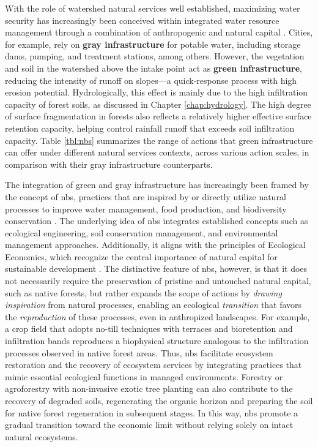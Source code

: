 \documentclass[./main_en.tex]{subfiles}
\begin{document}
\par With the role of watershed natural services well established, maximizing water security has increasingly been conceived within integrated water resource management through a combination of anthropogenic and natural capital \cite{un2018}. Cities, for example, rely on \textbf{gray infrastructure} for potable water, including storage dams, pumping, and treatment stations, among others. However, the vegetation and soil in the watershed above the intake point act as \textbf{green infrastructure}, reducing the intensity of runoff on slopes—a quick-response process with high erosion potential. Hydrologically, this effect is mainly due to the high infiltration capacity of forest soils, as discussed in Chapter \ref{chap:hydrology}. The high degree of surface fragmentation in forests also reflects a relatively higher effective surface retention capacity, helping control rainfall runoff that exceeds soil infiltration capacity. Table \ref{tbl:nbs} summarizes the range of actions that green infrastructure can offer under different natural services contexts, across various action scales, in comparison with their gray infrastructure counterparts.

\par The integration of green and gray infrastructure has increasingly been framed by the concept of \acrfull{nbs}, practices that are inspired by or directly utilize natural processes to improve water management, food production, and biodiversity conservation \cite{un2018, fao2019}. The underlying idea of \acrshort{nbs} integrates established concepts such as ecological engineering, soil conservation management, and environmental management approaches. Additionally, it aligns with the principles of Ecological Economics, which recognize the central importance of natural capital for sustainable development \cite{nesshover2017}. The distinctive feature of \acrshort{nbs}, however, is that it does not necessarily require the preservation of pristine and untouched natural capital, such as native forests, but rather expands the scope of actions by \textit{drawing inspiration} from natural processes, enabling an ecological \textit{transition} that favors the \textit{reproduction} of these processes, even in anthropized landscapes. For example, a crop field that adopts no-till techniques with terraces and bioretention and infiltration bands reproduces a biophysical structure analogous to the infiltration processes observed in native forest areas. Thus, \acrshort{nbs} facilitate ecosystem restoration and the recovery of ecosystem services by integrating practices that mimic essential ecological functions in managed environments. Forestry or agroforestry with non-invasive exotic tree planting can also contribute to the recovery of degraded soils, regenerating the organic horizon and preparing the soil for native forest regeneration in subsequent stages. In this way, \acrshort{nbs} promote a gradual transition toward the economic limit without relying solely on intact natural ecosystems.
\end{document}
